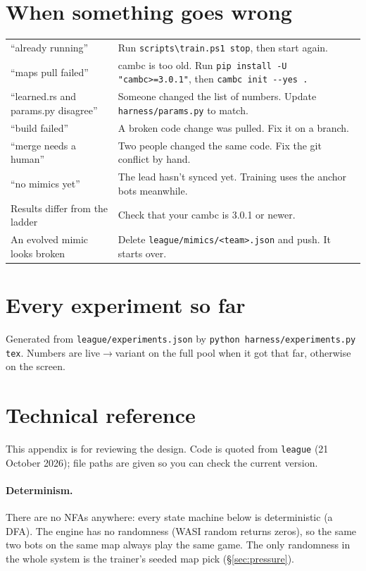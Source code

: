 \documentclass[11pt,a4paper]{article}
\newcommand{\f}[1]{\texttt{#1}}
\begin{document}
\section{When something goes wrong}
\begin{tabularx}{\linewidth}{@{}lX@{}}
\toprule
``already running'' & Run \f{scripts\textbackslash train.ps1 stop}, then start again.\\
``maps pull failed'' & cambc is too old. Run \f{pip install -U "cambc>=3.0.1"}, then \f{cambc init -{}-yes .}\\
``learned.rs and params.py disagree'' & Someone changed the list of numbers. Update \f{harness/params.py} to match.\\
``build failed'' & A broken code change was pulled. Fix it on a branch.\\
``merge needs a human'' & Two people changed the same code. Fix the git conflict by hand.\\
``no mimics yet'' & The lead hasn't synced yet. Training uses the anchor bots meanwhile.\\
Results differ from the ladder & Check that your cambc is 3.0.1 or newer.\\
An evolved mimic looks broken & Delete \f{league/mimics/<team>.json} and push. It starts over.\\
\bottomrule
\end{tabularx}

\appendix
\lstset{basicstyle=\ttfamily\footnotesize}
\section{Every experiment so far}\label{sec:registry}
Generated from \f{league/experiments.json} by \f{python harness/experiments.py tex}. Numbers are
live$\to$variant on the full pool when it got that far, otherwise on the screen.

{\footnotesize

}

\section{Technical reference}\label{sec:tech}
This appendix is for reviewing the design. Code is quoted from \f{league} (21 October 2026); file paths
are given so you can check the current version.

\paragraph{Determinism.} There are no NFAs anywhere: every state machine below is deterministic (a DFA). The
engine has no randomness (WASI random returns zeros), so the same two bots on the same map always play the
same game. The only randomness in the whole system is the trainer's seeded map pick (\S\ref{sec:pressure}).
\end{document}
